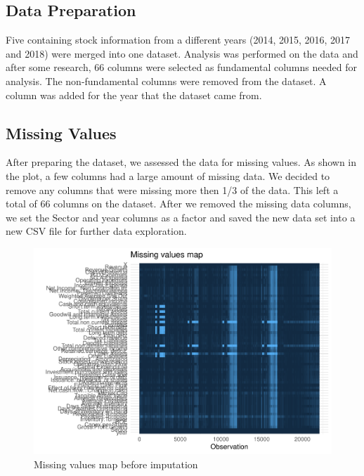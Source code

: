 \documentclass[11pt,]{article}
\begin{document}
\hypertarget{data-preparation}{%
\subsection{Data Preparation}\label{data-preparation}}

Five containing stock information from a different years (2014, 2015,
2016, 2017 and 2018) were merged into one dataset. Analysis was
performed on the data and after some research, 66 columns were selected
as fundamental columns needed for analysis. The non-fundamental columns
were removed from the dataset. A column was added for the year that the
dataset came from.

\hypertarget{missing-values}{%
\subsection{Missing Values}\label{missing-values}}

After preparing the dataset, we assessed the data for missing values. As
shown in the plot, a few columns had a large amount of missing data. We
decided to remove any columns that were missing more then 1/3 of the
data. This left a total of 66 columns on the dataset. After we removed
the missing data columns, we set the Sector and year columns as a factor
and saved the new data set into a new CSV file for further data
exploration.

\begin{figure}

{\centering \includegraphics{stock_analysis_files/figure-latex/missing values-1} 

}

\caption{Missing values map before imputation}\label{fig:missing values}
\end{figure}
\end{document}

